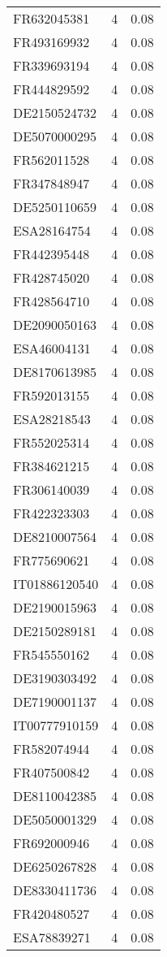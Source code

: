 \begin{table*}[htbp]
\begin{tabular}{lrr}
FR632045381 & 4 & 0.08 \\
FR493169932 & 4 & 0.08 \\
FR339693194 & 4 & 0.08 \\
FR444829592 & 4 & 0.08 \\
DE2150524732 & 4 & 0.08 \\
DE5070000295 & 4 & 0.08 \\
FR562011528 & 4 & 0.08 \\
FR347848947 & 4 & 0.08 \\
DE5250110659 & 4 & 0.08 \\
ESA28164754 & 4 & 0.08 \\
FR442395448 & 4 & 0.08 \\
FR428745020 & 4 & 0.08 \\
FR428564710 & 4 & 0.08 \\
DE2090050163 & 4 & 0.08 \\
ESA46004131 & 4 & 0.08 \\
DE8170613985 & 4 & 0.08 \\
FR592013155 & 4 & 0.08 \\
ESA28218543 & 4 & 0.08 \\
FR552025314 & 4 & 0.08 \\
FR384621215 & 4 & 0.08 \\
FR306140039 & 4 & 0.08 \\
FR422323303 & 4 & 0.08 \\
DE8210007564 & 4 & 0.08 \\
FR775690621 & 4 & 0.08 \\
IT01886120540 & 4 & 0.08 \\
DE2190015963 & 4 & 0.08 \\
DE2150289181 & 4 & 0.08 \\
FR545550162 & 4 & 0.08 \\
DE3190303492 & 4 & 0.08 \\
DE7190001137 & 4 & 0.08 \\
IT00777910159 & 4 & 0.08 \\
FR582074944 & 4 & 0.08 \\
FR407500842 & 4 & 0.08 \\
DE8110042385 & 4 & 0.08 \\
DE5050001329 & 4 & 0.08 \\
FR692000946 & 4 & 0.08 \\
DE6250267828 & 4 & 0.08 \\
DE8330411736 & 4 & 0.08 \\
FR420480527 & 4 & 0.08 \\
ESA78839271 & 4 & 0.08 \\

\end{tabular}
\end{table*}
